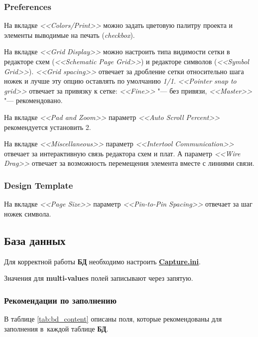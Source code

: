 \subsubsection{Preferences}

На вкладке \textit{<<Colors/Print>>} можно задать цветовую палитру проекта и элементы выводимые на печать (\textit{checkbox}).

На вкладке \textit{<<Grid Display>>} можно настроить типа видимости сетки в редакторе схем (\textit{<<Schematic Page Grid>>}) и редакторе символов (\textit{<<Symbol Grid>>}). \textit{<<Grid spacing>>} отвечает за дробление сетки относительно шага ножек  и лучше эту опцию оставлять по умолчанию \textit{1/1}. \textit{<<Pointer snap to grid>>} отвечает за привязку к сетке: \textit{<<Fine>>} "--- без привязи, \textit{<<Master>>} "--- рекомендовано.

На вкладке \textit{<<Pad and Zoom>>} параметр \textit{<<Auto Scroll Percent>>} рекомендуется установить 2.

На вкладке \textit{<<Miscellaneous>>} параметр \textit{<<Intertool Communication>>} отвечает за интерактивную связь редактора схем и плат. А параметр \textit{<<Wire Drag>>} отвечает за возможность перемещения элемента вместе с линиями связи.



\subsubsection{Design Template}

На вкладке \textit{<<Page Size>>} параметр \textit{<<Pin-to-Pin Spacing>>} отвечает за шаг ножек символа.



\newpage
\subsection{База данных} \label{ssec:bd}

Для корректной работы \textbf{БД} необходимо настроить \hyperref[sssec:cis_setup_capture_ini]{\textbf{Capture.ini}}.

Значения для \textbf{multi-values} полей записывают через запятую.

\subsubsection{Рекомендации по заполнению} \label{sssec:bd_contet}
В таблице \ref{tab:bd_content} описаны поля, которые рекомендованы для заполнения в~каждой таблице \textbf{БД}.


